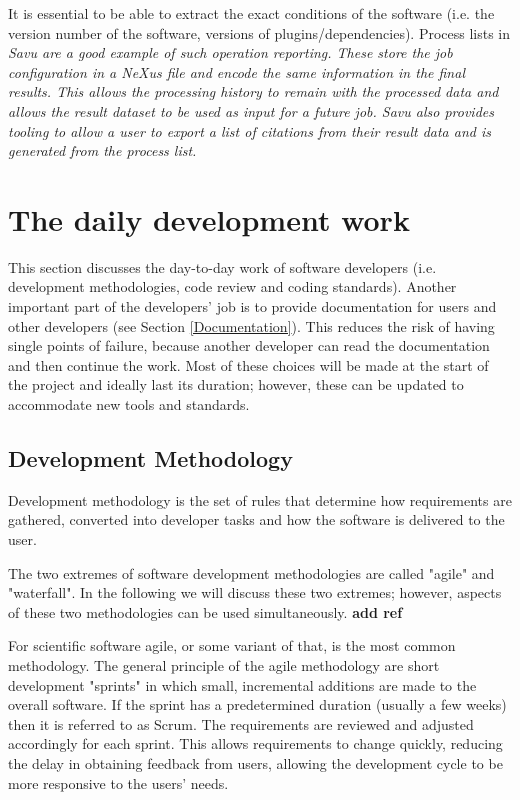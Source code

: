 \documentclass[jnr]{iosart2x}
\newcommand{\todo}[1]{\textbf{#1}}
\begin{document}
It is essential to be able to extract the exact conditions of the software (i.e. the version number of the software, versions of plugins/dependencies).
Process lists in \it Savu \cite{Wadeson_2016} are a good example of such operation reporting.
These store the job configuration in a NeXus file and encode the same information in the final results.
This allows the processing history to remain with the processed data and allows the result dataset to be used as input for a future job.
Savu also provides tooling to allow a user to export a list of citations from their result data and is generated from the process list.

\section{The daily development work}
\label{Business as Usual}

This section discusses the day-to-day work of software developers (i.e. development methodologies, code review and coding standards).
Another important part of the developers' job is to provide documentation for users and other developers (see Section \ref{Documentation}).
This reduces the risk of having single points of failure, because another developer can read the documentation and then continue the work.
Most of these choices will be made at the start of the project and ideally last its duration; however, these can be updated to accommodate new tools and standards.

\subsection{Development Methodology}
\label{Development methodology}

Development methodology is the set of rules that determine how requirements are gathered, converted into developer tasks and how the software is delivered to the user.

The two extremes of software development methodologies are called "agile" and "waterfall".
In the following we will discuss these two extremes; however, aspects of these two methodologies can be used simultaneously. \todo{add ref}

For scientific software agile, or some variant of that, is the most common methodology.
The general principle of the agile methodology are short development "sprints" in which small, incremental additions are made to the overall software.
If the sprint has a predetermined duration (usually a few weeks) then it is referred to as Scrum.
The requirements are reviewed and adjusted accordingly for each sprint.
This allows requirements to change quickly, reducing the delay in obtaining feedback from users, allowing the development cycle to be more responsive to the users' needs.
\end{document}
